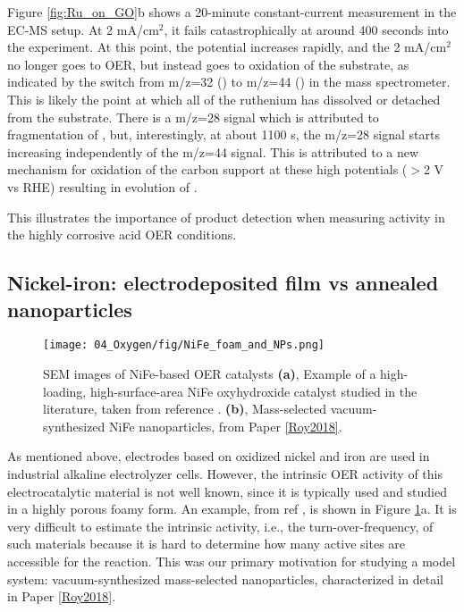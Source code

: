 Figure \ref{fig:Ru_on_GO}b shows a 20-minute constant-current measurement in the EC-MS setup. At 2 mA/cm$^2$, it fails catastrophically at around 400 seconds into the experiment. At this point, the potential increases rapidly, and the 2 mA/cm$^2$ no longer goes to OER, but instead goes to oxidation of the substrate, as indicated by the switch from m/z=32 () to m/z=44 () in the mass spectrometer. This is likely the point at which all of the ruthenium has dissolved or detached from the substrate. There is a m/z=28 signal which is attributed to fragmentation of , but, interestingly, at about 1100 s, the m/z=28 signal starts increasing independently of the m/z=44 signal. This is attributed to a new mechanism for oxidation of the carbon support at these high potentials ($>$2 V vs RHE) resulting in evolution of . 

This illustrates the importance of product detection when measuring activity in the highly corrosive acid OER conditions.

\subsection{Nickel-iron: electrodeposited film vs annealed nanoparticles}\label{subsec:NiFe}

\begin{figure}[b!]
	\centering
	\texttt{[image: 04\_Oxygen/fig/NiFe\_foam\_and\_NPs.png]}
	\caption{SEM images of NiFe-based OER catalysts \textbf{(a)}, Example of a high-loading, high-surface-area NiFe oxyhydroxide catalyst studied in the literature, taken from reference . \textbf{(b)}, Mass-selected vacuum-synthesized NiFe nanoparticles, from Paper \ref{Roy2018}.}
	\label{fig:NiFe_foam_and_NPs}
\end{figure}

As mentioned above, electrodes based on oxidized nickel and iron are used in industrial alkaline electrolyzer cells. However, the intrinsic OER activity of this electrocatalytic material is not well known, since it is typically used and studied in a highly porous foamy form\cite{Dionigi2016b}. An example, from ref , is shown in Figure \ref{fig:NiFe_foam_and_NPs}a. It is very difficult to estimate the intrinsic activity, i.e., the turn-over-frequency, of such materials because it is hard to determine how many active sites are accessible for the reaction. This was our primary motivation for studying a model system: vacuum-synthesized mass-selected  nanoparticles, characterized in detail in Paper \ref{Roy2018}.

